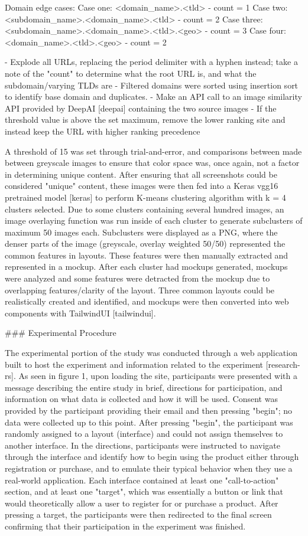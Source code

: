 Domain edge cases:
Case one: <domain_name>.<tld> - count = 1
Case two: <subdomain_name>.<domain_name>.<tld> - count = 2
Case three: <subdomain_name>.<domain_name>.<tld>.<geo> - count = 3
Case four: <domain_name>.<tld>.<geo> - count = 2

- Explode all URLs, replacing the period delimiter with a hyphen instead; take a note of the "count" to determine what the root URL is, and what the subdomain/varying TLDs are
- Filtered domains were sorted using insertion sort to identify base domain and duplicates.
- Make an API call to an image similarity API provided by DeepAI [deepai] containing the two source images
- If the threshold value is above the set maximum, remove the lower ranking site and instead keep the URL with higher ranking precedence

A threshold of 15 was set through trial-and-error, and comparisons between made between greyscale images to ensure that color space was, once again, not a factor in determining unique content. After ensuring that all screenshots could be considered "unique" content, these images were then fed into a Keras vgg16 pretrained model [keras] to perform K-means clustering algorithm with k = 4 clusters selected. Due to some clusters containing several hundred images, an image overlaying function was run inside of each cluster to generate subclusters of maximum 50 images each. Subclusters were displayed as a PNG, where the denser parts of the image (greyscale, overlay weighted 50/50) represented the common features in layouts. These features were then manually extracted and represented in a mockup. After each cluster had mockups generated, mockups were analyzed and some features were detracted from the mockup due to overlapping features/clarity of the layout. Three common layouts could be realistically created and identified, and mockups were then converted into web components with TailwindUI [tailwindui].

### Experimental Procedure

The experimental portion of the study was conducted through a web application built to host the experiment and information related to the experiment [research-rs]. As seen in figure 1, upon loading the site, participants were presented with a message describing the entire study in brief, directions for participation, and information on what data is collected and how it will be used. Consent was provided by the participant providing their email and then pressing "begin"; no data were collected up to this point. After pressing "begin", the participant was randomly assigned to a layout (interface) and could not assign themselves to another interface. In the directions, participants were instructed to navigate through the interface and identify how to begin using the product either through registration or purchase, and to emulate their typical behavior when they use a real-world application. Each interface contained at least one "call-to-action" section, and at least one "target", which was essentially a button or link that would theoretically allow a user to register for or purchase a product. After pressing a target, the participants were then redirected to the final screen confirming that their participation in the experiment was finished.

